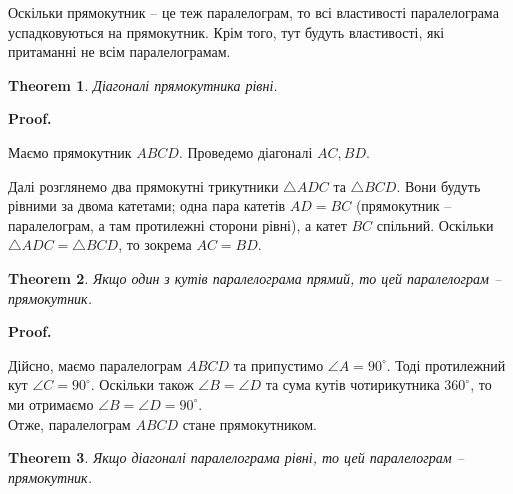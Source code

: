 \documentclass[a4paper, 10pt]{article}
\makeatletter
\theoremstyle{theoremdd}
\newtheorem{theorem}{Theorem}[subsection]
\theoremstyle{theoremdd}
\theoremstyle{theoremdd}
\theoremstyle{theoremdd}
\theoremstyle{theoremdd}
\theoremstyle{theoremdd}
\theoremstyle{theoremdd}
\theoremstyle{theoremdd}
\theoremstyle{theoremdd}
\renewenvironment{proof}[1][Proof.\\]{\par
\pushQED{\hfill \qed}%
\normalfont \topsep6\p@\@plus6\p@\relax
\trivlist
\item\relax
{\bfseries
#1\@addpunct{.}}\hspace\labelsep\ignorespaces
}{%
\popQED\endtrivlist\@endpefalse
}
\makeatother
\begin{document}
Оскільки прямокутник -- це теж паралелограм, то всі властивості паралелограма успадковуються на прямокутник. Крім того, тут будуть властивості, які притаманні не всім паралелограмам.

\begin{theorem}
Діагоналі прямокутника рівні.
\end{theorem}

\begin{proof}
Маємо прямокутник $ABCD$. Проведемо діагоналі $AC, BD$.
\begin{figure}[H]
\centering
{}
\end{figure}
Далі розглянемо два прямокутні трикутники $\triangle ADC$ та $\triangle BCD$. Вони будуть рівними за двома катетами; одна пара катетів $AD = BC$ (прямокутник -- паралелограм, а там протилежні сторони рівні), а катет $BC$ спільний. Оскільки $\triangle ADC = \triangle BCD$, то зокрема $AC = BD$.
\end{proof}

\begin{theorem}
Якщо один з кутів паралелограма прямий, то цей паралелограм -- прямокутник.
\end{theorem}

\begin{proof}
Дійсно, маємо паралелограм $ABCD$ та припустимо $\angle A = 90^\circ$. Тоді протилежний кут $\angle C = 90^\circ$. Оскільки також $\angle B = \angle D$ та сума кутів чотирикутника $360^\circ$, то ми отримаємо $\angle B = \angle D = 90^\circ$.\\
Отже, паралелограм $ABCD$ стане прямокутником.
\end{proof}

\begin{theorem}
Якщо діагоналі паралелограма рівні, то цей паралелограм -- прямокутник.
\end{theorem}
\end{document}
